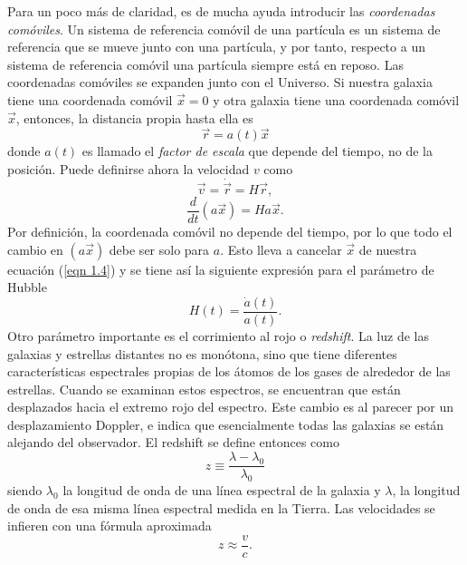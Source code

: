 \documentclass[a4paper,openright,12pt]{book}
\begin{document}
Para un poco más de claridad, es de mucha ayuda introducir las \textit{coordenadas comóviles}. Un sistema de referencia comóvil de una partícula es un sistema de referencia que se mueve junto con una partícula, y por tanto, respecto a un sistema de referencia comóvil una partícula siempre está en reposo. Las coordenadas comóviles se expanden junto con el Universo. Si nuestra galaxia tiene una coordenada comóvil $\vec{x}=0$ y otra galaxia tiene una coordenada comóvil $\vec{x}$, entonces, la distancia propia hasta ella es
\begin{equation}
\vec{r} = a(t)\vec{x}\label{eqn 1.2}
\end{equation}
donde $a(t)$ es llamado el \textit{factor de escala} que depende del tiempo, no de la posición. Puede definirse ahora la velocidad $v$ como 
\begin{equation}
\vec{v} = \dot{\vec{r}} = H\vec{r},\label{eqn 1.3}
\end{equation}
\begin{equation}
\frac{d}{dt}(a\vec{x})= Ha\vec{x}.\label{eqn 1.4}
\end{equation} 
Por definición, la coordenada comóvil no depende del tiempo, por lo que todo el cambio en $(a\vec{x})$ debe ser solo para $a$. Esto lleva a cancelar $\vec{x}$ de nuestra ecuación (\ref{eqn 1.4}) y se tiene así la siguiente expresión para el parámetro de Hubble
\begin{equation}
H(t) = \frac{\dot{a}(t)}{a(t)}.\label{eqn 1.5}
\end{equation}
Otro parámetro importante es el corrimiento al rojo o \textit{redshift}. La luz de las galaxias y estrellas distantes no es monótona, sino que tiene diferentes características espectrales propias de los átomos de los gases de alrededor de las estrellas. Cuando se examinan estos espectros, se encuentran que están desplazados hacia el extremo rojo del espectro. Este cambio es al parecer por un desplazamiento Doppler, e indica que esencialmente todas las galaxias se están alejando del observador. El redshift se define entonces como 
\begin{equation}
 z \equiv \frac{\lambda - \lambda_{0}}{\lambda_{0}}\label{eqn 1.6}
\end{equation}
siendo $\lambda_{0}$ la longitud de onda de una línea espectral de la galaxia y $\lambda$, la longitud de onda de esa misma línea espectral medida en la Tierra. Las velocidades se infieren con una fórmula aproximada 
\begin{equation*}
z \approx \frac{v}{c}.
\end{equation*}
\end{document}
